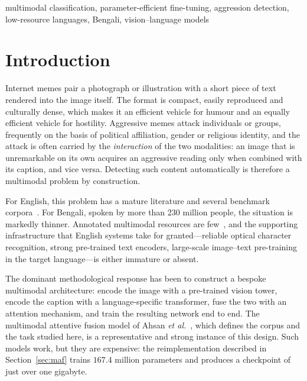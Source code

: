\documentclass[conference]{IEEEtran}
\begin{document}
\begin{IEEEkeywords}
multimodal classification, parameter-efficient fine-tuning, aggression
detection, low-resource languages, Bengali, vision--language models
\end{IEEEkeywords}

\section{Introduction}
\label{sec:intro}

Internet memes pair a photograph or illustration with a short piece of text
rendered into the image itself. The format is compact, easily reproduced and
culturally dense, which makes it an efficient vehicle for humour and an equally
efficient vehicle for hostility. Aggressive memes attack individuals or groups,
frequently on the basis of political affiliation, gender or religious identity,
and the attack is often carried by the \emph{interaction} of the two modalities:
an image that is unremarkable on its own acquires an aggressive reading only
when combined with its caption, and vice versa. Detecting such content
automatically is therefore a multimodal problem by construction.

For English, this problem has a mature literature and several benchmark
corpora~\cite{kiela2020,suryawanshi2020,gomez2020}. For Bengali, spoken by more
than 230 million people, the situation is markedly thinner. Annotated
multimodal resources are few~\cite{karim2022,hossain2022b}, and the supporting
infrastructure that English systems take for granted---reliable optical
character recognition, strong pre-trained text encoders, large-scale
image--text pre-training in the target language---is either immature or absent.

The dominant methodological response has been to construct a bespoke multimodal
architecture: encode the image with a pre-trained vision tower, encode the
caption with a language-specific transformer, fuse the two with an attention
mechanism, and train the resulting network end to end. The multimodal attentive
fusion model of Ahsan \emph{et al.}~\cite{ahsan2024}, which defines the corpus
and the task studied here, is a representative and strong instance of this
design. Such models work, but they are expensive: the reimplementation described
in Section~\ref{sec:maf} trains $167.4$ million parameters and produces a
checkpoint of just over one gigabyte.
\end{document}
